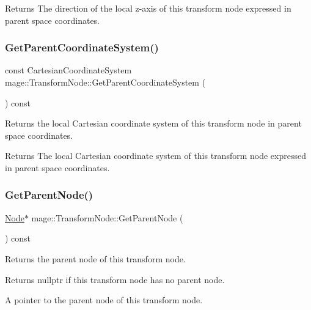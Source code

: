 \begin{DoxyReturn}{Returns}
The direction of the local z-\/axis of this transform node expressed in parent space coordinates. 
\end{DoxyReturn}
\hypertarget{classmage_1_1_transform_node_aff2b422a7d240d4d2278f2960e18b3bf}{}\label{classmage_1_1_transform_node_aff2b422a7d240d4d2278f2960e18b3bf} 
\subsubsection{\texorpdfstring{Get\+Parent\+Coordinate\+System()}{GetParentCoordinateSystem()}}
{\footnotesize\ttfamily const Cartesian\+Coordinate\+System mage\+::\+Transform\+Node\+::\+Get\+Parent\+Coordinate\+System (\begin{DoxyParamCaption}{ }\end{DoxyParamCaption}) const}

Returns the local Cartesian coordinate system of this transform node in parent space coordinates.

\begin{DoxyReturn}{Returns}
The local Cartesian coordinate system of this transform node expressed in parent space coordinates. 
\end{DoxyReturn}
\hypertarget{classmage_1_1_transform_node_ad7b40df4dd3d8973382c8a7fe36323b6}{}\label{classmage_1_1_transform_node_ad7b40df4dd3d8973382c8a7fe36323b6} 
\subsubsection{\texorpdfstring{Get\+Parent\+Node()}{GetParentNode()}}
{\footnotesize\ttfamily \hyperlink{classmage_1_1_node}{Node}$\ast$ mage\+::\+Transform\+Node\+::\+Get\+Parent\+Node (\begin{DoxyParamCaption}{ }\end{DoxyParamCaption}) const\hspace{0.3cm}{\ttfamily [private]}}

Returns the parent node of this transform node.

\begin{DoxyReturn}{Returns}
{\ttfamily nullptr} if this transform node has no parent node. 

A pointer to the parent node of this transform node. 
\end{DoxyReturn}
\hypertarget{classmage_1_1_transform_node_ac22e00fc9d96642bf96bcbb121d685ab}{}\label{classmage_1_1_transform_node_ac22e00fc9d96642bf96bcbb121d685ab} 
